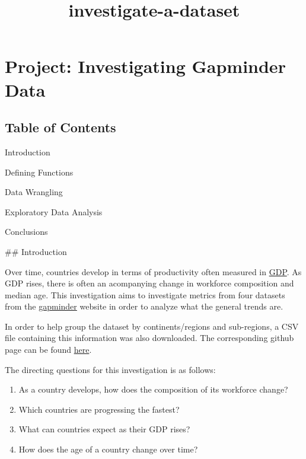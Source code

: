 \documentclass[11pt]{article}
\title{investigate-a-dataset}
\begin{document}
    
    
    \maketitle
    
    

    
    \section{Project: Investigating Gapminder
Data}\label{project-investigating-gapminder-data}

\subsection{Table of Contents}\label{table-of-contents}

Introduction

Defining Functions

Data Wrangling

Exploratory Data Analysis

Conclusions

     \#\# Introduction

Over time, countries develop in terms of productivity often measured in
\href{https://en.wikipedia.org/wiki/Gross_domestic_product}{GDP}. As GDP
rises, there is often an acompanying change in workforce composition and
median age. This investigation aims to investigate metrics from four
datasets from the \href{http://www.gapminder.org/data/}{gapminder}
website in order to analyze what the general trends are.

In order to help group the dataset by continents/regions and
sub-regions, a CSV file containing this information was also downloaded.
The corresponding github page can be found
\href{https://github.com/lukes/ISO-3166-Countries-with-Regional-Codes}{here}.

The directing questions for this investigation is as follows:

\begin{enumerate}
\def\labelenumi{\arabic{enumi}.}
\item
  As a country develops, how does the composition of its workforce
  change?
\item
  Which countries are progressing the fastest?
\item
  What can countries expect as their GDP rises?
\item
  How does the age of a country change over time?
\end{enumerate}
\end{document}

